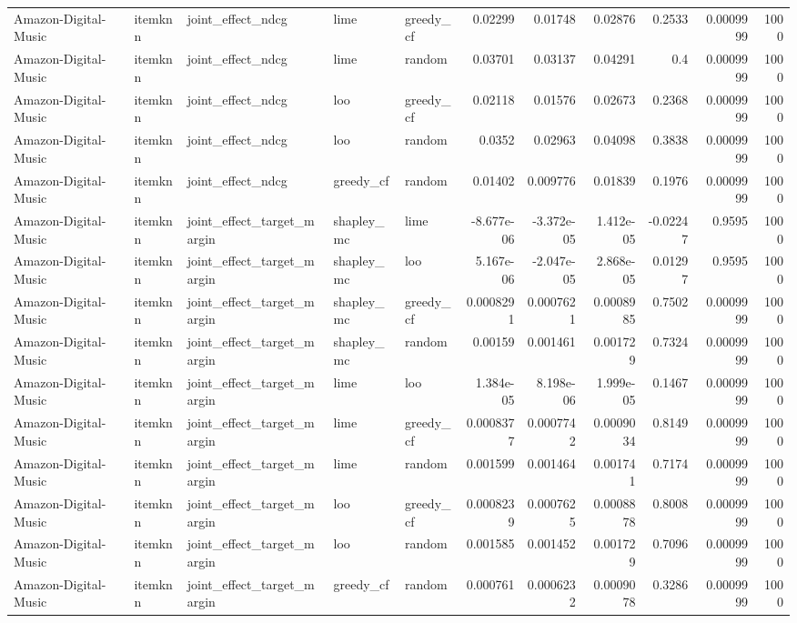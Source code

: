 \begin{table}[t]
\begin{tabular}{lllllrrrrrr}
Amazon-Digital-Music & itemknn & joint\_effect\_ndcg & lime & greedy\_cf & 0.02299 & 0.01748 & 0.02876 & 0.2533 & 0.0009999 & 1000 \\
Amazon-Digital-Music & itemknn & joint\_effect\_ndcg & lime & random & 0.03701 & 0.03137 & 0.04291 & 0.4 & 0.0009999 & 1000 \\
Amazon-Digital-Music & itemknn & joint\_effect\_ndcg & loo & greedy\_cf & 0.02118 & 0.01576 & 0.02673 & 0.2368 & 0.0009999 & 1000 \\
Amazon-Digital-Music & itemknn & joint\_effect\_ndcg & loo & random & 0.0352 & 0.02963 & 0.04098 & 0.3838 & 0.0009999 & 1000 \\
Amazon-Digital-Music & itemknn & joint\_effect\_ndcg & greedy\_cf & random & 0.01402 & 0.009776 & 0.01839 & 0.1976 & 0.0009999 & 1000 \\
Amazon-Digital-Music & itemknn & joint\_effect\_target\_margin & shapley\_mc & lime & -8.677e-06 & -3.372e-05 & 1.412e-05 & -0.02247 & 0.9595 & 1000 \\
Amazon-Digital-Music & itemknn & joint\_effect\_target\_margin & shapley\_mc & loo & 5.167e-06 & -2.047e-05 & 2.868e-05 & 0.01297 & 0.9595 & 1000 \\
Amazon-Digital-Music & itemknn & joint\_effect\_target\_margin & shapley\_mc & greedy\_cf & 0.0008291 & 0.0007621 & 0.0008985 & 0.7502 & 0.0009999 & 1000 \\
Amazon-Digital-Music & itemknn & joint\_effect\_target\_margin & shapley\_mc & random & 0.00159 & 0.001461 & 0.001729 & 0.7324 & 0.0009999 & 1000 \\
Amazon-Digital-Music & itemknn & joint\_effect\_target\_margin & lime & loo & 1.384e-05 & 8.198e-06 & 1.999e-05 & 0.1467 & 0.0009999 & 1000 \\
Amazon-Digital-Music & itemknn & joint\_effect\_target\_margin & lime & greedy\_cf & 0.0008377 & 0.0007742 & 0.0009034 & 0.8149 & 0.0009999 & 1000 \\
Amazon-Digital-Music & itemknn & joint\_effect\_target\_margin & lime & random & 0.001599 & 0.001464 & 0.001741 & 0.7174 & 0.0009999 & 1000 \\
Amazon-Digital-Music & itemknn & joint\_effect\_target\_margin & loo & greedy\_cf & 0.0008239 & 0.0007625 & 0.0008878 & 0.8008 & 0.0009999 & 1000 \\
Amazon-Digital-Music & itemknn & joint\_effect\_target\_margin & loo & random & 0.001585 & 0.001452 & 0.001729 & 0.7096 & 0.0009999 & 1000 \\
Amazon-Digital-Music & itemknn & joint\_effect\_target\_margin & greedy\_cf & random & 0.000761 & 0.0006232 & 0.0009078 & 0.3286 & 0.0009999 & 1000 \\

\end{tabular}
\end{table}
